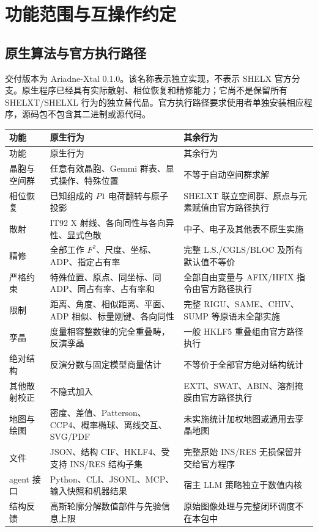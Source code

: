 \chapter{功能范围与互操作约定}
\label{app:capabilities}
\section{原生算法与官方执行路径}
交付版本为 Ariadne-Xtal 0.1.0。该名称表示独立实现，不表示 SHELX 官方分支。原生程序已经具有实际散射、相位恢复和精修能力；它尚不是保留所有 SHELXT/SHELXL 行为的独立替代品。官方执行路径要求使用者单独安装相应程序，源码包不包含其二进制或源代码。

\small
\begin{longtable}{p{31mm}p{57mm}p{44mm}}
\toprule 功能 & 原生行为 & 其余行为\\\midrule\endfirsthead
\toprule 功能 & 原生行为 & 其余行为\\\midrule\endhead
晶胞与空间群 & 任意有效晶胞、Gemmi 群表、显式操作、特殊位置 & 不等于自动空间群求解\\
相位恢复 & 已知组成的 $P1$ 电荷翻转与原子投影 & SHELXT 联立空间群、原点与元素赋值由官方路径执行\\
散射 & IT92 X 射线、各向同性与各向异性、显式色散 & 中子、电子及其他表不原生实施\\
精修 & 全部工作 $F^2$、尺度、坐标、ADP、指定占有率 & 完整 L.S./CGLS/BLOC 及所有默认值不等价\\
严格约束 & 特殊位置、原点、同坐标、同 ADP、同占有率、占有率和 & 全部自由变量与 AFIX/HFIX 指令由官方路径执行\\
限制 & 距离、角度、相似距离、平面、ADP 相似、标量刚键、各向同性 & 完整 RIGU、SAME、CHIV、SUMP 等原语未全部实施\\
孪晶 & 度量相容整数律的完全重叠畴，反演孪晶 & 一般 HKLF5 重叠组由官方路径执行\\
绝对结构 & 反演分数与固定模型商量估计 & 不等价于全部官方绝对结构统计\\
其他散射校正 & 不隐式加入 & EXTI、SWAT、ABIN、溶剂掩膜由官方路径执行\\
地图与绘图 & 密度、差值、Patterson、CCP4、概率椭球、离线交互、SVG/PDF & 未实施统计加权地图或通用去孪晶地图\\
文件 & JSON、结构 CIF、HKLF4、受支持 INS/RES 结构子集 & 完整原始 INS/RES 无损保留并交给官方程序\\
agent 接口 & Python、CLI、JSONL、MCP、输入快照和机器结果 & 宿主 LLM 策略独立于数值内核\\
结构反馈 & 高斯轮廓分解数值部件与先验信息上限 & 原始图像处理与完整闭环调度不在本包中\\
\bottomrule
\end{longtable}
\normalsize

